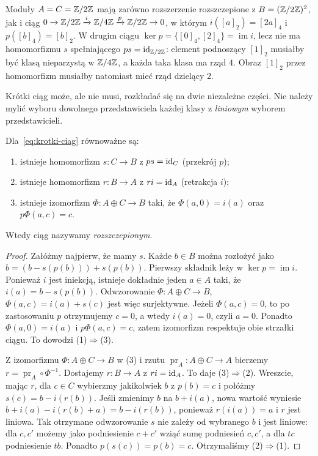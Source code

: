 \begin{przyklad}
\label{prz:ses-dwa-rozszerzenia}
Moduły $A=C=\mathbb{Z}/2\mathbb{Z}$ mają zarówno rozszerzenie
rozszczepione z $B=(\mathbb{Z}/2\mathbb{Z})^2$, jak i ciąg
$0\to\mathbb{Z}/2\mathbb{Z}\xrightarrow{i}\mathbb{Z}/4\mathbb{Z}
\xrightarrow{p}\mathbb{Z}/2\mathbb{Z}\to0$, w którym
$i([a]_2)=[2a]_4$ i $p([b]_4)=[b]_2$.
W drugim ciągu $\ker p=\{[0]_4,[2]_4\}
=\operatorname{im}i$, lecz nie ma homomorfizmu
$s$ spełniającego $ps=\mathrm{id}_{\mathbb{Z}/2\mathbb{Z}}$:
element podnoszący $[1]_2$ musiałby być klasą
nieparzystą w $\mathbb{Z}/4\mathbb{Z}$, a każda taka klasa ma
rząd $4$. Obraz $[1]_2$ przez homomorfizm
musiałby natomiast mieć rząd dzielący $2$.
\end{przyklad}

Krótki ciąg może, ale nie musi, rozkładać się
na dwie niezależne części. Nie należy mylić
wyboru dowolnego przedstawiciela każdej klasy
z \emph{liniowym} wyborem przedstawicieli.

\begin{twierdzenie}
\label{thm:ses-rozszczepienie}
Dla~\eqref{eq:krotki-ciag} równoważne są:
\begin{enumerate}[leftmargin=*]
\item istnieje homomorfizm $s:C\to B$
      z $p s=\mathrm{id}_C$ (przekrój $p$);
\item istnieje homomorfizm $r:B\to A$
      z $r i=\mathrm{id}_A$ (retrakcja $i$);
\item istnieje izomorfizm $\Phi:A\oplus C\to B$
      taki, że $\Phi(a,0)=i(a)$ oraz
      $p\Phi(a,c)=c$.
\end{enumerate}
Wtedy ciąg nazywamy \emph{rozszczepionym}.
\end{twierdzenie}
\begin{proof}
Załóżmy najpierw, że mamy $s$.
Każde $b\in B$ można rozłożyć jako
$b=(b-s(p(b)))+s(p(b))$.
Pierwszy składnik leży w $\ker p=\operatorname{im}i$.
Ponieważ $i$ jest iniekcją, istnieje dokładnie
jeden $a\in A$ taki, że $i(a)=b-s(p(b))$.
Odwzorowanie
$\Phi:A\oplus C\to B$, $\Phi(a,c)=i(a)+s(c)$
jest więc surjektywne. Jeżeli $\Phi(a,c)=0$,
to po zastosowaniu $p$ otrzymujemy $c=0$,
a wtedy $i(a)=0$, czyli $a=0$.
Ponadto $\Phi(a,0)=i(a)$ i $p\Phi(a,c)=c$,
zatem izomorfizm respektuje obie strzałki ciągu.
To dowodzi (1)$\Rightarrow$(3).

Z izomorfizmu $\Phi:A\oplus C\to B$ w (3) i rzutu
$\operatorname{pr}_A:A\oplus C\to A$ bierzemy
$r=\operatorname{pr}_A\circ\Phi^{-1}$. Dostajemy
$r:B\to A$ z $ri=\mathrm{id}_A$. To daje (3)$\Rightarrow$(2).
Wreszcie, mając $r$, dla $c\in C$ wybierzmy
jakikolwiek $b$ z $p(b)=c$ i połóżmy
$s(c)=b-i(r(b))$. Jeśli zmienimy $b$ na
$b+i(a)$, nowa wartość wyniesie
$b+i(a)-i(r(b)+a)=b-i(r(b))$,
ponieważ $r(i(a))=a$ i $r$ jest liniowa.
Tak otrzymane odwzorowanie $s$ nie zależy od
wybranego $b$ i jest liniowe: dla $c,c'$
możemy jako podniesienie $c+c'$ wziąć sumę
podniesień $c,c'$, a dla $tc$ podniesienie $tb$.
Ponadto $p(s(c))=p(b)=c$.
Otrzymaliśmy (2)$\Rightarrow$(1).
\end{proof}

